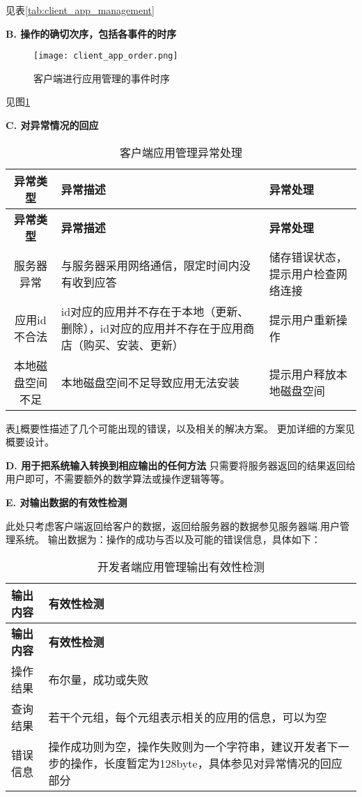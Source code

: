 见表\ref{tab:client_app_management}

\textbf{B. 操作的确切次序，包括各事件的时序}

\begin{figure}[ht]
	\centering
	\texttt{[image: client\_app\_order.png]}
	\caption{客户端进行应用管理的事件时序} \label{fig:client_app_order}
\end{figure}
见图\ref{fig:client_app_order}

\textbf{C. 对异常情况的回应}

\begin{longtable}{|c|p{6cm}|p{6cm}|}
\caption{客户端应用管理异常处理}\label{tab:client_app_management_exception}\\
\hline
\textbf{异常类型} & \textbf{异常描述} & \textbf{异常处理}\\
\hline
\endfirsthead

\hline
\textbf{异常类型} & \textbf{异常描述} & \textbf{异常处理}\\
\hline
\endhead
\hline 
\endfoot
\hline
\endlastfoot
服务器异常 & 
与服务器采用网络通信，限定时间内没有收到应答 &
储存错误状态，提示用户检查网络连接\\
应用id不合法 
& id对应的应用并不存在于本地（更新、删除），id对应的应用并不存在于应用商店（购买、安装、更新）
& 提示用户重新操作\\
本地磁盘空间不足
& 本地磁盘空间不足导致应用无法安装
& 提示用户释放本地磁盘空间\\
\end{longtable}

表\ref{tab:client_app_management_exception}概要性描述了几个可能出现的错误，以及相关的解决方案。
更加详细的方案见概要设计。

\textbf{D. 用于把系统输入转换到相应输出的任何方法}
只需要将服务器返回的结果返回给用户即可，不需要额外的数学算法或操作逻辑等等。
		
\textbf{E. 对输出数据的有效性检测}

此处只考虑客户端返回给客户的数据，返回给服务器的数据参见服务器端.用户管理系统。
输出数据为：操作的成功与否以及可能的错误信息，具体如下：
\begin{longtable}{|p{7cm}|p{7cm}|}
\caption{开发者端应用管理输出有效性检测}\label{tab:concrete_dev_sys_output_valid} \\
\hline
\textbf{输出内容} & \textbf{有效性检测} \\
\hline
\endfirsthead
\hline
\textbf{输出内容} & \textbf{有效性检测} \\
\hline
\endhead
\hline 
\endfoot
\hline
\endlastfoot

操作结果 & 布尔量，成功或失败 \\
查询结果 & 若干个元组，每个元组表示相关的应用的信息，可以为空\\
错误信息 & 操作成功则为空，操作失败则为一个字符串，建议开发者下一步的操作，长度暂定为128byte，具体参见对异常情况的回应部分\\
\end{longtable}


